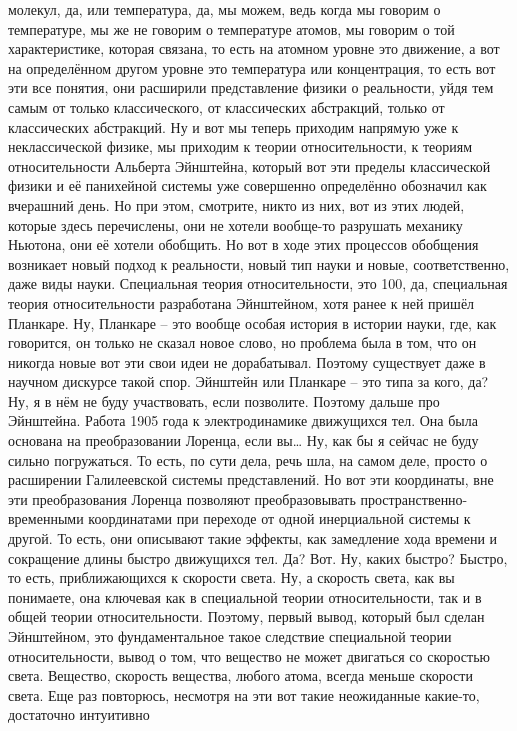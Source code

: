 молекул, да, или температура, да, мы можем, ведь когда мы говорим о температуре,
мы же не говорим о температуре атомов, мы говорим о той характеристике, которая
связана, то есть на атомном уровне это движение, а вот на определённом другом
уровне это температура или концентрация, то есть вот эти все понятия, они
расширили представление физики о реальности, уйдя тем самым от только
классического, от классических абстракций, только от классических абстракций. Ну
и вот мы теперь приходим напрямую уже к неклассической физике, мы приходим к
теории относительности, к теориям относительности Альберта Эйнштейна, который
вот эти пределы классической физики и её панихейной системы уже совершенно
определённо обозначил как вчерашний день. Но при этом, смотрите, никто из них,
вот из этих людей, которые здесь перечислены, они не хотели вообще-то разрушать
механику Ньютона, они её хотели обобщить. Но вот в ходе этих процессов обобщения
возникает новый подход к реальности, новый тип науки и новые, соответственно,
даже виды науки. Специальная теория относительности, это 100, да, специальная
теория относительности разработана Эйнштейном, хотя ранее к ней пришёл Планкаре.
Ну, Планкаре – это вообще особая история в истории науки, где, как говорится, он
только не сказал новое слово, но проблема была в том, что он никогда новые вот
эти свои идеи не дорабатывал. Поэтому существует даже в научном дискурсе такой
спор. Эйнштейн или Планкаре – это типа за кого, да? Ну, я в нём не буду
участвовать, если позволите. Поэтому дальше про Эйнштейна. Работа 1905 года к
электродинамике движущихся тел. Она была основана на преобразовании Лоренца,
если вы… Ну, как бы я сейчас не буду сильно погружаться. То есть, по сути дела,
речь шла, на самом деле, просто о расширении Галилеевской системы представлений.
Но вот эти координаты, вне эти преобразования Лоренца позволяют преобразовывать
пространственно-временными координатами при переходе от одной инерциальной
системы к другой. То есть, они описывают такие эффекты, как замедление хода
времени и сокращение длины быстро движущихся тел. Да? Вот. Ну, каких быстро?
Быстро, то есть, приближающихся к скорости света. Ну, а скорость света, как вы
понимаете, она ключевая как в специальной теории относительности, так и в общей
теории относительности. Поэтому, первый вывод, который был сделан Эйнштейном,
это фундаментальное такое следствие специальной теории относительности, вывод о
том, что вещество не может двигаться со скоростью света. Вещество, скорость
вещества, любого атома, всегда меньше скорости света. Еще раз повторюсь,
несмотря на эти вот такие неожиданные какие-то, достаточно интуитивно
